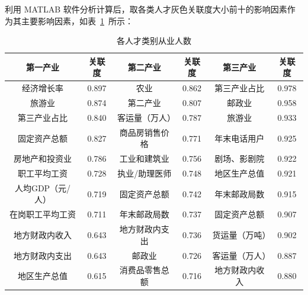 \documentclass{whutmod}
\begin{document}
\begin{itemize}
	利用 MATLAB 软件分析计算后，取各类人才灰色关联度大小前十的影响因素作为其主要影响因素，如表~\ref{guan}~所示：
		\begin{table}[H]
		\centering
		\caption{各人才类别从业人数}\label{guan}
		\begin{tabular}{cccccc}
			\toprule[2pt]
			\multicolumn{1}{m{3cm}}{\centering 第一产业}&
			\multicolumn{1}{m{1.5cm}|}{\centering 关联度} & \multicolumn{1}{m{3cm}}{\centering 第二产业} & \multicolumn{1}{m{1.5cm}|}{\centering 关联度}&
			\multicolumn{1}{m{3cm}}{\centering 第三产业} & \multicolumn{1}{m{1.5cm}}{\centering 关联度}\\
			\midrule[1pt]
			经济增长率	 &  0.897 & 农业&0.862&第三产业占比&0.978\\ 
			旅游业 &  0.874&第二产业&0.807&邮政业&0.958\\ 
			第三产业占比	 &  0.840&客运量（万人）&0.787&旅游业&0.933\\ 
			固定资产总额&  0.827& 商品房销售价格&0.771&年末电话用户&0.925\\ 
			房地产和投资业  & 0.786& 工业和建筑业&0.756&剧场、影剧院&0.922\\
			职工平均工资  &0.728& 执业/助理医师&0.748&地区生产总值&0.921\\
			人均GDP（元/人）  & 0.719& 固定资产总额&0.742&年末邮政局数&0.915\\
			在岗职工平均工资  & 0.711& 年末邮政局数&0.737&固定资产总额&0.907\\
			地方财政内收入  & 0.643& 地方财政内支出&0.736&货运量（万吨）&0.902\\
			地方财政内支出&0.643& 邮政业&0.726&客运量（万人）&0.887\\
			地区生产总值&0.615&消费品零售总额&0.716&地方财政内收入&0.880\\
			\bottomrule[2pt]
		\end{tabular}
	\end{table}
	
	

\end{itemize}
\end{document}

